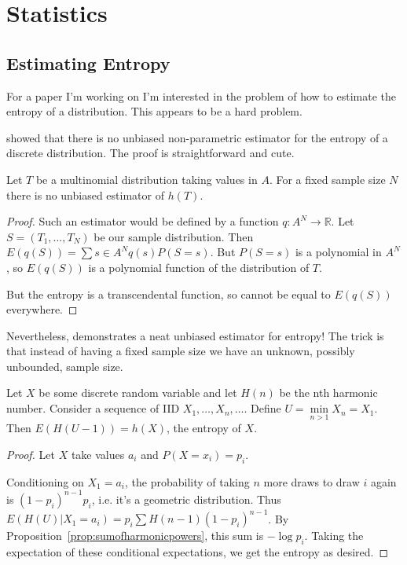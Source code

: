 \chapter{Statistics}

\section{Estimating Entropy}

For a paper I'm working on I'm interested in the problem of how to estimate the entropy of a distribution.
This appears to be a hard problem.

\cite{DBLP:journals/neco/Paninski03} showed that there is no unbiased non-parametric estimator for the entropy of a discrete distribution.
The proof is straightforward and cute.

\begin{theorem}
Let \(T\) be a multinomial distribution taking values in \(A\).
For a fixed sample size \(N\) there is no unbiased estimator of \(h(T)\).
\end{theorem}

\begin{proof}
Such an estimator would be defined by a function \(q: A^N \to \mathbb{R}\).
Let \(S = (T_1, \ldots, T_N)\) be our sample distribution.
Then \(E(q(S)) = \sum\limits{s \in A^N} q(s) P(S = s)\).
But \(P(S = s)\) is a polynomial in \(A^N\), so \(E(q(S))\) is a polynomial function of the distribution of \(T\).

But the entropy is a transcendental function,
so cannot be equal to \(E(q(S))\) everywhere.
\end{proof}

Nevertheless, 
\cite{1410.5002} demonstrates a neat unbiased estimator for entropy!
The trick is that instead of having a fixed sample size we have an unknown,
possibly unbounded, sample size.

\begin{theorem}
Let \(X\) be some discrete random variable and let \(H(n)\) be the nth harmonic number.
Consider a sequence of IID \(X_1, \ldots, X_n, \ldots\).
Define \(U = \min\limits_{n > 1} X_n = X_1\).
Then \(E(H(U - 1)) = h(X)\),
the entropy of \(X\).
\end{theorem}

\begin{proof}
Let \(X\) take values \(a_i\) and \(P(X = x_i) = p_i\).

Conditioning on \(X_1 = a_i\),
the probability of taking \(n\) more draws to draw \(i\) again is \((1 - p_i)^{n - 1} p_i\),
i.e. it's a geometric distribution.
Thus \(E(H(U) | X_1 = a_i) = p_i \sum H(n - 1) (1 - p_i)^{n - 1}\).
By Proposition~\ref{prop:sumofharmonicpowers},
this sum is \(-\log p_i\).
Taking the expectation of these conditional expectations,
we get the entropy as desired.

\end{proof}

